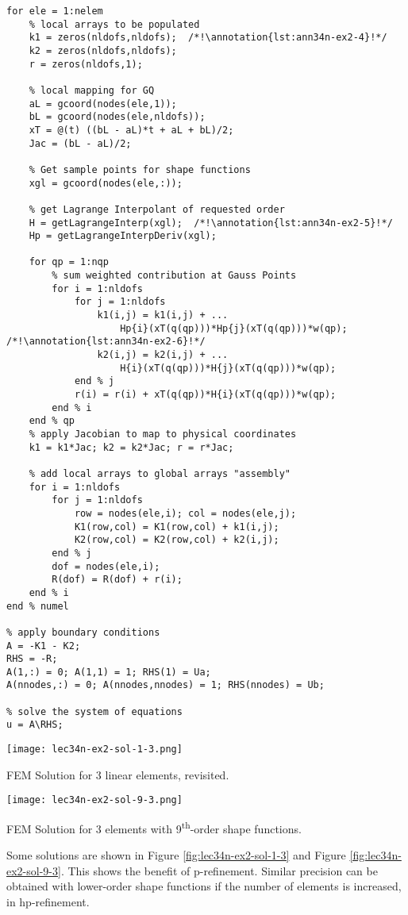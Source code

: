 \begin{lstlisting}[style=myMatlab,name=lec34n-ex2]
% carry out assembly process
for ele = 1:nelem
    % local arrays to be populated
    k1 = zeros(nldofs,nldofs);  /*!\annotation{lst:ann34n-ex2-4}!*/
    k2 = zeros(nldofs,nldofs);
    r = zeros(nldofs,1);
    
    % local mapping for GQ
    aL = gcoord(nodes(ele,1));
    bL = gcoord(nodes(ele,nldofs));
    xT = @(t) ((bL - aL)*t + aL + bL)/2;
    Jac = (bL - aL)/2;

    % Get sample points for shape functions
    xgl = gcoord(nodes(ele,:));
    
    % get Lagrange Interpolant of requested order
    H = getLagrangeInterp(xgl);  /*!\annotation{lst:ann34n-ex2-5}!*/
    Hp = getLagrangeInterpDeriv(xgl);

    for qp = 1:nqp        
        % sum weighted contribution at Gauss Points
        for i = 1:nldofs
            for j = 1:nldofs
                k1(i,j) = k1(i,j) + ...
                    Hp{i}(xT(q(qp)))*Hp{j}(xT(q(qp)))*w(qp); /*!\annotation{lst:ann34n-ex2-6}!*/
                k2(i,j) = k2(i,j) + ...
                    H{i}(xT(q(qp)))*H{j}(xT(q(qp)))*w(qp);
            end % j
            r(i) = r(i) + xT(q(qp))*H{i}(xT(q(qp)))*w(qp);
        end % i     
    end % qp
    % apply Jacobian to map to physical coordinates
    k1 = k1*Jac; k2 = k2*Jac; r = r*Jac;

    % add local arrays to global arrays "assembly"
    for i = 1:nldofs
        for j = 1:nldofs
            row = nodes(ele,i); col = nodes(ele,j);
            K1(row,col) = K1(row,col) + k1(i,j);
            K2(row,col) = K2(row,col) + k2(i,j);
        end % j
        dof = nodes(ele,i);
        R(dof) = R(dof) + r(i);
    end % i
end % numel

% apply boundary conditions
A = -K1 - K2;
RHS = -R;
A(1,:) = 0; A(1,1) = 1; RHS(1) = Ua;
A(nnodes,:) = 0; A(nnodes,nnodes) = 1; RHS(nnodes) = Ub;

% solve the system of equations
u = A\RHS;
\end{lstlisting}
\begin{marginfigure}[-3.0cm]
\texttt{[image: lec34n-ex2-sol-1-3.png]}
\caption{FEM Solution for 3 linear elements, revisited.}
\label{fig:lec34n-ex2-sol-1-3}
\end{marginfigure}

\begin{marginfigure}[1.0cm]
\texttt{[image: lec34n-ex2-sol-9-3.png]}
\caption{FEM Solution for 3 elements with 9\textsuperscript{th}-order shape functions.}
\label{fig:lec34n-ex2-sol-9-3}
\end{marginfigure}
Some solutions are shown in Figure \ref{fig:lec34n-ex2-sol-1-3} and Figure \ref{fig:lec34n-ex2-sol-9-3}.  This shows the benefit of p-refinement. Similar precision can be obtained with lower-order shape functions if the number of elements is increased, in hp-refinement. 

